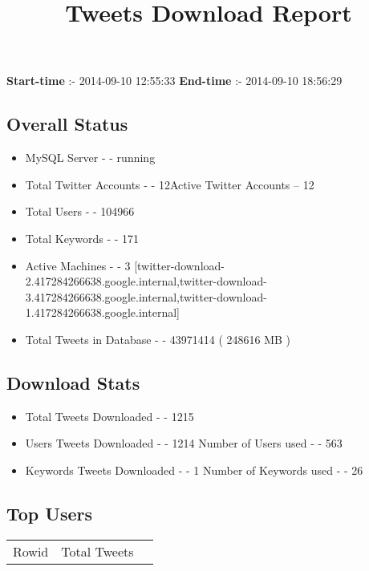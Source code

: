 \documentclass{article}\usepackage[T1]{fontenc}
\begin{document}
\title{\textbf{Tweets Download Report}}
               \date{}
                \maketitle
               \centerline{\textbf{Start-time} :- 2014-09-10 12:55:33 \hspace{40pt} \textbf{End-time} :- 2014-09-10 18:56:29}               \subsection*{Overall Status}                \begin{itemize}                \item MySQL Server - - running               \item Total Twitter Accounts - - 12\newline Active Twitter Accounts -- 12               \item Total Users - - 104966               \item Total Keywords - - 171               \item Active Machines - - 3 [twitter-download-2.417284266638.google.internal,twitter-download-3.417284266638.google.internal,twitter-download-1.417284266638.google.internal]               \item Total Tweets in Database - - 43971414 ( 248616 MB )               \end{itemize}               \subsection*{Download Stats}                \begin{itemize}                \item Total Tweets Downloaded - - 1215               \item Users Tweets Downloaded - - 1214 \newline Number of Users used - - 563               \item Keywords Tweets Downloaded - - 1 \newline Number of Keywords used - - 26              \end{itemize}              \subsection*{Top Users}\begin{tabular}{|c|c|c|}         \hline         Rowid & Total Tweets \\ 

\end{tabular}
\end{document}

